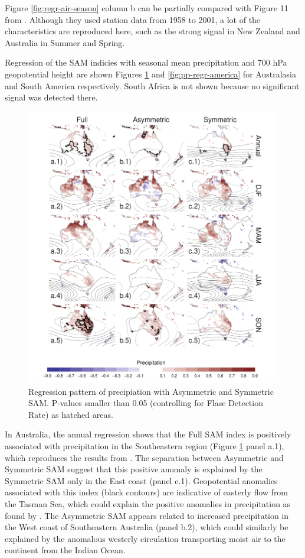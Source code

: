 \documentclass[twocol]{ametsocV5}
\begin{document}
Figure \ref{fig:regr-air-season} column b can be partially compared with
Figure 11 from \citet{fogt2012}. Although they used station data from
1958 to 2001, a lot of the characteristics are reproduced here, such as
the strong signal in New Zealand and Australia in Summer and Spring.

Regression of the SAM indicies with seasonal mean precipitation and 700
hPa geopotential height are shown Figures \ref{fig:pp-regr-oceania} and
\ref{fig:pp-regr-america} for Australasia and South America
respectively. South Africa is not shown because no significant signal
was detected there.

\begin{figure}
\includegraphics{pp-regr-oceania-1} \caption[Regression pattern of precipiation with Asymmetric and Symmetric SAM]{Regression pattern of precipiation with Asymmetric and Symmetric SAM. P-values smaller than 0.05 (controlling for Flase Detection Rate) as hatched areas.}\label{fig:pp-regr-oceania}
\end{figure}

In Australia, the annual regression shows that the Full SAM index is
positively associated with precipitation in the Southeastern region
(Figure \ref{fig:pp-regr-oceania} panel a.1), which reproduces the
results from \citet{gillett2006}. The separation between Asymmetric and
Symmetric SAM suggest that this positive anomaly is explained by the
Symmetric SAM only in the East coast (panel c.1). Geopotential anomalies
associated with this index (black contours) are indicative of easterly
flow from the Tasman Sea, which could explain the positive anomalies in
precipitation as found by \citet{hendon2007}. The Asymmetric SAM appears
related to increased precipitation in the West coast of Southeastern
Australia (panel b.2), which could similarly be explained by the
anomalous westerly circulation transporting moist air to the continent
from the Indian Ocean.
\end{document}
